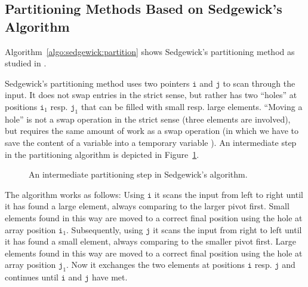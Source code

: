 \documentclass[prodmode,acmtalg]{acmsmall}
\begin{document}
\subsection{Partitioning Methods Based on Sedgewick's Algorithm}\label{app:sec:sedgewick}
Algorithm~\ref{algo:sedgewick:partition} shows Sedgewick's partitioning method
as studied in \cite{sedgewick}.

Sedgewick's partitioning method uses two
pointers $\texttt{i}$ and $\texttt{j}$ to scan through the input. 
It does not swap
entries in the strict sense, but rather has two ``holes'' at positions
$\texttt{i}_1$ resp. $\texttt{j}_1$ that can be filled with small resp. large
elements. ``Moving a hole'' is not a swap operation in the strict sense (three elements are involved), but requires the
same amount of work as a swap operation (in which we have to save the content of a
variable into a temporary variable \cite{sedgewick}). An intermediate step in
the partitioning algorithm is depicted in Figure~\ref{fig:sedgewick:layout}.

\begin{figure}[tb]
    \centering
    \caption{An intermediate partitioning step in Sedgewick's algorithm.}
    \label{fig:sedgewick:layout}
\end{figure}

The algorithm works as follows: Using $\texttt{i}$
it scans the input
from left to right until it has found a large element, always
comparing to the larger pivot first. Small elements found in this way are moved
to a correct final position using the hole at array position $\texttt{i}_1$. Subsequently, using $\texttt{j}$ it scans
the input from right to left until it has found a small element, always
comparing to the smaller pivot first. Large elements found in this way are moved
to a correct final position using the hole at array position $\texttt{j}_1$. Now it exchanges
the two elements at positions $\texttt{i}$ resp. $\texttt{j}$ and
continues until $\texttt{i}$ and $\texttt{j}$ have met.  
\end{document}

